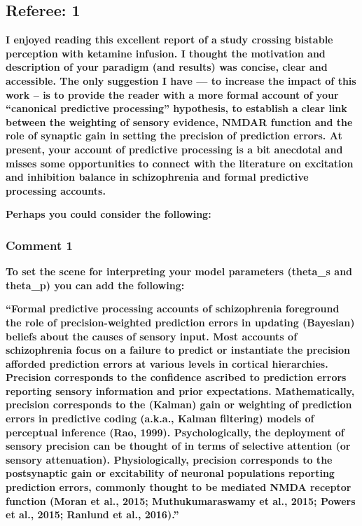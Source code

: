 \documentclass[
]{article}
\begin{document}
\subsection{Referee: 1}\label{referee-1}

\textbf{I enjoyed reading this excellent report of a study crossing
bistable perception with ketamine infusion. I thought the motivation and
description of your paradigm (and results) was concise, clear and
accessible. The only suggestion I have --- to increase the impact of
this work -- is to provide the reader with a more formal account of your
``canonical predictive processing'' hypothesis, to establish a clear
link between the weighting of sensory evidence, NMDAR function and the
role of synaptic gain in setting the precision of prediction errors. At
present, your account of predictive processing is a bit anecdotal and
misses some opportunities to connect with the literature on excitation
and inhibition balance in schizophrenia and formal predictive processing
accounts.}

\textbf{Perhaps you could consider the following:}

\subsubsection{Comment 1}\label{comment-1}

\textbf{To set the scene for interpreting your model parameters
(theta\_s and theta\_p) you can add the following:}

\textbf{``Formal predictive processing accounts of schizophrenia
foreground the role of precision-weighted prediction errors in updating
(Bayesian) beliefs about the causes of sensory input. Most accounts of
schizophrenia focus on a failure to predict or instantiate the precision
afforded prediction errors at various levels in cortical hierarchies.
Precision corresponds to the confidence ascribed to prediction errors
reporting sensory information and prior expectations. Mathematically,
precision corresponds to the (Kalman) gain or weighting of prediction
errors in predictive coding (a.k.a., Kalman filtering) models of
perceptual inference (Rao, 1999). Psychologically, the deployment of
sensory precision can be thought of in terms of selective attention (or
sensory attenuation). Physiologically, precision corresponds to the
postsynaptic gain or excitability of neuronal populations reporting
prediction errors, commonly thought to be mediated NMDA receptor
function (Moran et al., 2015; Muthukumaraswamy et al., 2015; Powers et
al., 2015; Ranlund et al., 2016).''}
\end{document}
